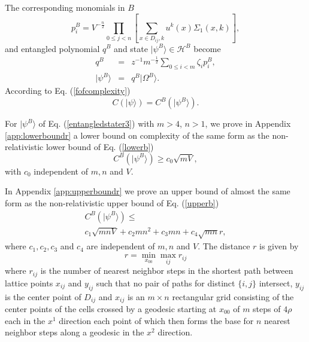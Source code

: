 \documentclass[twocolumn,amsmath,amssymb]{revtex4-1}
\begin{document}
The corresponding monomials in $B$ 
\begin{equation}
\label{pstatesrb}
p^B_i = 
V^{-\frac{n}{2}}\prod_{0 \le j <n} \left[\sum_{x \in D_{ij}, k} u^k(x) \Sigma_1( x,k )\right],
\end{equation}
and entangled polynomial $q^B$ and state $|\psi^B \rangle  \in \mathcal{H}^B$ become
\begin{subequations}
\begin{eqnarray}
\label{entangledstater2}
q^B &=& z^{-1} m^{-\frac{1}{2}}\sum_{0 \le i < m} \zeta_i p^B_i, \\ 
\label{entangledstater3}
|\psi^B \rangle   &=&  q^B|\Omega^B \rangle .
\end{eqnarray}
\end{subequations}
According to Eq. (\ref{fofcomplexity})
\begin{equation}
  \label{cofrelpsi}
  C( |\psi \rangle ) = C^B( |\psi^B \rangle ).
\end{equation}

For $|\psi^B \rangle $ of Eq. (\ref{entangledstater3})
with $m > 4$, $n > 1$,
we prove in Appendix \ref{app:lowerboundr} a lower bound on complexity
of the same form as the non-relativistic lower bound of Eq. (\ref{lowerb})
\begin{equation}
\label{lowerbr}
C^B( |\psi^B \rangle ) \geq c_0 \sqrt{ m V},
\end{equation}
with $c_0$ independent of $m, n$ and $V$.

In Appendix \ref{app:upperboundr} we prove an
upper bound of almost the same form as the non-relativistic upper bound of Eq. (\ref{upperb})
\begin{multline}
\label{upperbr}
C^B( |\psi^B \rangle ) \leq \\ c_1 \sqrt{m n V} + c_2 m n^2 + c_3 m n + c_4\sqrt{mn} r,
\end{multline}
where $c_1, c_2, c_3$ and $c_4$ are independent of $m, n$ and $V$.
The distance $r$ is given by
\begin{equation}
  \label{defsbar1}
  r = \min_{x_{00}} \max_{ij} r_{ij}
\end{equation}
where $r_{ij}$ is the number of nearest
neighbor steps in the
shortest path between
lattice points $x_{ij}$ and $y_{ij}$
such that no pair of paths for distinct
$\{i, j\}$ intersect,
$y_{ij}$ is the center point of $D_{ij}$
and $x_{ij}$ is an $m \times n$ rectangular grid
consisting of the center points of
the cells crossed by a geodesic starting at $x_{00}$ of $m$ steps of
$4 \rho$ each in the $x^1$ direction each
point of which then forms the base for 
$n$ nearest neighbor steps along a geodesic in
the $x^2$ direction.
\end{document}
